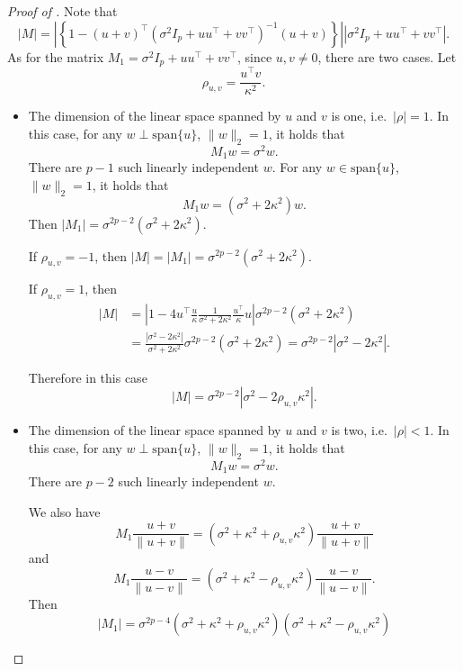 \documentclass[twoside]{article}
\begin{document}
\begin{proof}[Proof of ]
Note that
	\[
		|M| = \left|\left\{1 - (u+v)^{\top} \left(\sigma^2 I_p + uu^{\top} + vv^{\top}\right)^{-1}(u+v)\right\}\right| \left|\sigma^2 I_p + uu^{\top} + vv^{\top}\right|.
	\]	
	As for the matrix $M_1 = \sigma^2 I_p + uu^{\top} + vv^{\top}$, since $u, v \neq 0$, there are two cases.  Let 
	\[
		\rho_{u, v} = \frac{u^{\top} v}{\kappa^2}.
	\]
	\begin{itemize}
	\item The dimension of the linear space spanned by $u$ and $v$ is one, i.e.~$|\rho| = 1$.  In this case, for any $w \perp \mathrm{span}\{u\}$, $\|w\|_2 = 1$, it holds that
		\[
			M_1 w = \sigma^2 w.
		\] 	
		There are $p-1$ such linearly independent $w$.  For any $w \in \mathrm{span}\{u\}$, $\|w\|_2 = 1$, it holds that
		\[
			M_1 w = (\sigma^2 + 2\kappa^2) w.
		\]
		Then $|M_1| = \sigma^{2p-2}(\sigma^2 + 2\kappa^2)$.
		
		If $\rho_{u, v} = -1$, then $|M| = |M_1| = \sigma^{2p-2}(\sigma^2 + 2\kappa^2)$.
		
		If $\rho_{u, v} = 1$, then 
		\begin{align*}
			|M| & = \left|1 - 4u^{\top} \frac{u}{\kappa} \frac{1}{\sigma^2 + 2\kappa^2} \frac{u^{\top}}{\kappa}u\right|\sigma^{2p-2}(\sigma^2 + 2\kappa^2) \\
			& = \frac{|\sigma^2 -  2\kappa^2|}{\sigma^2 + 2\kappa^2} \sigma^{2p-2}(\sigma^2 + 2\kappa^2) = \sigma^{2p-2}|\sigma^2 - 2\kappa^2|.
		\end{align*}
		
		Therefore in this case
		\[
			|M| = \sigma^{2p-2}|\sigma^2 - 2\rho_{u, v}\kappa^2|.
		\]

	\item The dimension of the linear space spanned by $u$ and $v$ is two, i.e.~$|\rho| < 1$.  In this case, for any $w \perp \mathrm{span}\{u\}$, $\|w\|_2 = 1$, it holds that
		\[
			M_1 w = \sigma^2 w.
		\] 	
		There are $p-2$ such linearly independent $w$.  
		
		We also have
		\[
			M_1 \frac{u+v}{\|u+v\|} = (\sigma^2 + \kappa^2 + \rho_{u, v}\kappa^2)\frac{u+v}{\|u+v\|}
		\]
		and
		\[
			M_1 \frac{u-v}{\|u-v\|} = (\sigma^2 + \kappa^2 - \rho_{u, v}\kappa^2)\frac{u-v}{\|u-v\|}.
		\]
		Then
		\[
			|M_1| = \sigma^{2p-4}(\sigma^2 + \kappa^2 + \rho_{u, v}\kappa^2)(\sigma^2 + \kappa^2 - \rho_{u, v}\kappa^2)
		\]
		

\end{itemize}
\end{proof}
\end{document}

